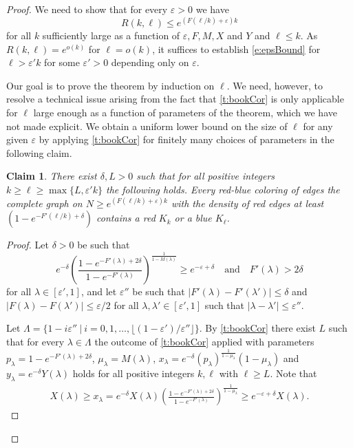 \documentclass[reqno,final,12pt]{amsart}
\newtheorem{claim}{Claim}[thm]
\newcommand{\eps}{\varepsilon}
\newcommand{\fs}[2]{\left(\frac{#1}{#2}\right)}
\newcommand{\s}[1]{\left(#1\right)}
\begin{document}
\begin{proof} We need to show that for every $\eps > 0$ we have \begin{equation}\label{e:epsBound}R(k,\ell) \leq e^{(F(\ell/k)+\eps)k}\end{equation} for all $k$ sufficiently large as a function of $\eps,F,M,X$ and $Y$ and $\ell \leq k$. As $R(k,\ell) = e^{o(k)}$ for  $\ell=o(k)$, it suffices to establish \eqref{e:epsBound} for $\ell > \eps'k$ for some $\eps'>0$ depending only on $\eps$.
	
	
Our goal is to prove the theorem by induction on $\ell$. We need, however, to resolve a technical issue arising from the fact that \cref{t:bookCor} is only applicable for $\ell$ large enough as a function of parameters of the theorem, which we have not made explicit. We obtain a uniform lower bound on the size of $\ell$ for any given $\eps$ by applying  \cref{t:bookCor} for finitely many choices of parameters  in the following claim.

\begin{claim}\label{c:gen}
	There exist $\delta, L >0$  such that for all positive integers  $k \geq \ell \geq \max\{ L, \eps' k \}$ the following holds.  Every red-blue coloring of edges the complete graph on $N \geq e^{(F(\ell/k)+\eps)k}$ with the density of red edges at least $(1 - e^{-F'(\ell/k)+\delta})$ contains a red $K_k$ or a blue $K_{\ell}$. 
\end{claim}

\begin{proof}  %
	Let $\delta > 0$ be such that $$e^{-\delta}\fs{1 - e^{-F'(\lambda)+2\delta}}{1-e^{-F'(\lambda)}}^{\frac{1}{1-M(\lambda)}} \geq e^{-\eps + \delta} \quad \mathrm{and} \quad F'(\lambda) > 2 \delta$$ for all $\lambda \in [\eps',1]$, and let $\eps''$ be such that $|F'(\lambda)-F'(\lambda')| \leq \delta$ and $|F(\lambda)-F(\lambda')| \leq \eps/2$ for all $\lambda,\lambda' \in [\eps',1]$ such that $|\lambda-\lambda'| \leq \eps''$.
	
	Let $\Lambda=\{1 - i\eps'' \: |\: i=0,1,\ldots, \lfloor (1-\eps')/\eps''\rfloor\} $.
	By  \cref{t:bookCor} there exist $L$ such that for every $\lambda \in \Lambda$ the outcome of \cref{t:bookCor}  applied with parameters $p_\lambda=1 - e^{-F'(\lambda)+2\delta}$,  $\mu_{\lambda}=M(\lambda)$, $x_{\lambda} = e^{-\delta}(p_{\lambda})^{\frac{1}{1-\mu_{\lambda}}}(1-\mu_{\lambda})$ and $y_{\lambda} = e^{-\delta}Y(\lambda)$ holds for all  positive integers $k,\ell$ with $\ell \geq L.$ Note that \begin{align*} X(\lambda) \geq x_{\lambda} = e^{-\delta}X(\lambda)\fs{1 - e^{-F'(\lambda)+2\delta}}{1-e^{-F'(\lambda)}}^{\frac{1}{1-\mu_{\lambda}}} \geq e^{-\eps+\delta}X(\lambda). \end{align*} 
	

\end{proof}
\end{proof}
\end{document}
